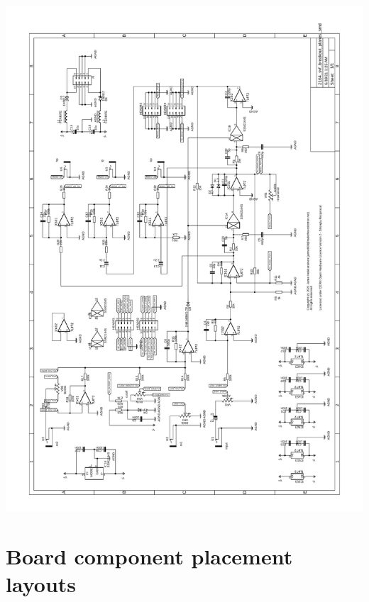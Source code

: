 \documentclass{article}
\begin{document}
\centering
\includegraphics[page=1, scale=0.6]{2164_svf_smd_schematic.pdf}

\section{Board component placement layouts}
\end{document}
